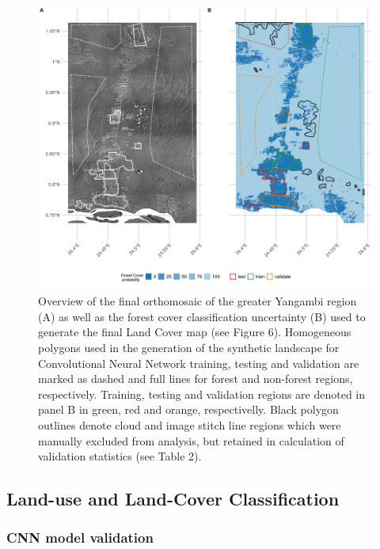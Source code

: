 \documentclass[remote sensing,article,submit,moreauthors,pdftex]{mdpi}
\begin{document}
\begin{figure}

{\centering \includegraphics[width=1\linewidth]{./figures/orthomosaic_maps} 

}

\caption{Overview of the final orthomosaic of the greater Yangambi region (A) as well as the forest cover classification uncertainty (B) used to generate the final Land Cover map (see Figure 6). Homogeneous polygons used in the generation of the synthetic landscape for Convolutional Neural Network training, testing and validation are marked as dashed and full lines for forest and non-forest regions, respectively. Training, testing and validation regions are denoted in panel B in green, red and orange, respectivelly. Black polygon outlines denote cloud and image stitch line regions which were manually excluded from analysis, but retained in calculation of validation statistics (see Table 2).}\label{fig:unnamed-chunk-6}
\end{figure}

\hypertarget{land-use-and-land-cover-classification}{%
\subsection{Land-use and Land-Cover
Classification}\label{land-use-and-land-cover-classification}}

\hypertarget{cnn-model-validation}{%
\subsubsection{CNN model validation}\label{cnn-model-validation}}
\end{document}
